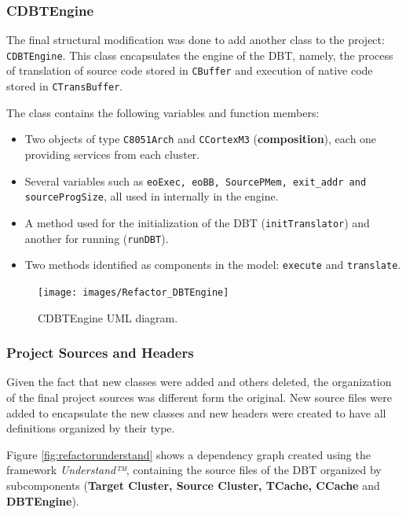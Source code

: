\documentclass[12pt]{article}
\begin{document}
{\subsubsection*{CDBTEngine}

The final structural modification was done to add another class to the project: \texttt{CDBTEngine}. This class encapsulates the engine of the DBT, namely, the process of translation of source code stored in \texttt{CBuffer} and execution of native code stored in \texttt{CTransBuffer}. 

The class contains the following variables and function members:
\begin{itemize}
\item Two objects of type \texttt{C8051Arch} and \texttt{CCortexM3} (\textbf{composition}), each one providing services from each cluster.
\item Several variables such as \texttt{eoExec, eoBB, SourcePMem, exit\_addr and sourceProgSize}, all used in internally in the engine.
\item A method used for the initialization of the DBT (\texttt{initTranslator}) and another for running (\texttt{runDBT}).
\item Two methods identified as components in the model: \texttt{execute} and \texttt{translate}.
\end{itemize}


\begin{figure}[H]
\centerline{
\texttt{[image: images/Refactor\_DBTEngine]}
}
\caption{CDBTEngine UML diagram.}
\label{fig:refactorproject} 
\end{figure}


\subsubsection*{Project Sources and Headers}

Given the fact that new classes were added and others deleted, the organization of the final project sources was different form the original. New source files were added to encapsulate the new classes and new headers were created to have all definitions organized by their type.

Figure \ref{fig:refactorunderstand} shows a dependency graph created using the framework \textit{Understand™}, containing the source files of the DBT organized by subcomponents (\textbf{Target Cluster, Source Cluster, TCache, CCache} and \textbf{DBTEngine}).
 
}
\end{document}
